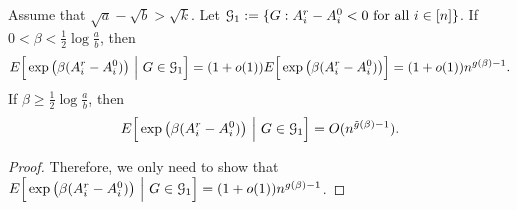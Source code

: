 \documentclass{article}
\begin{document}
\begin{proposition}  \label{prop:df}
Assume that $\sqrt{a}-\sqrt{b}>\sqrt{k}$. Let $\mathcal{G}_1:=\{G:A^r_i-A^0_i<0\text{~for all~}i\in[n]\}$.
If $0<\beta<\frac{1}{2}\log\frac{a}{b}$, then
$$
E \Big[  \exp\big(\beta (A^r_i-A^0_i) \big) ~\Big|~ G\in\mathcal{G}_1 \Big] 
= (1+o(1)) E \Big[   \exp\big(\beta (A^r_i-A^0_i) \big) \Big]
= (1+o(1)) n^{g(\beta)-1}  .
$$
If $\beta\ge\frac{1}{2}\log\frac{a}{b}$, then
\begin{align*}
E \Big[  \exp\big(\beta (A^r_i-A^0_i) \big) ~\Big|~ G\in\mathcal{G}_1 \Big] 
= O(n^{\tilde{g}(\beta)-1})  .
\end{align*}
\end{proposition}
\begin{proof}

Therefore, we only need to show that
$E \Big[\exp\big(\beta (A^r_i-A^0_i) \big) ~\Big|~ G\in\mathcal{G}_1 \Big] = (1+o(1))n^{g(\beta) - 1}$.


\end{proof}
\end{document}
